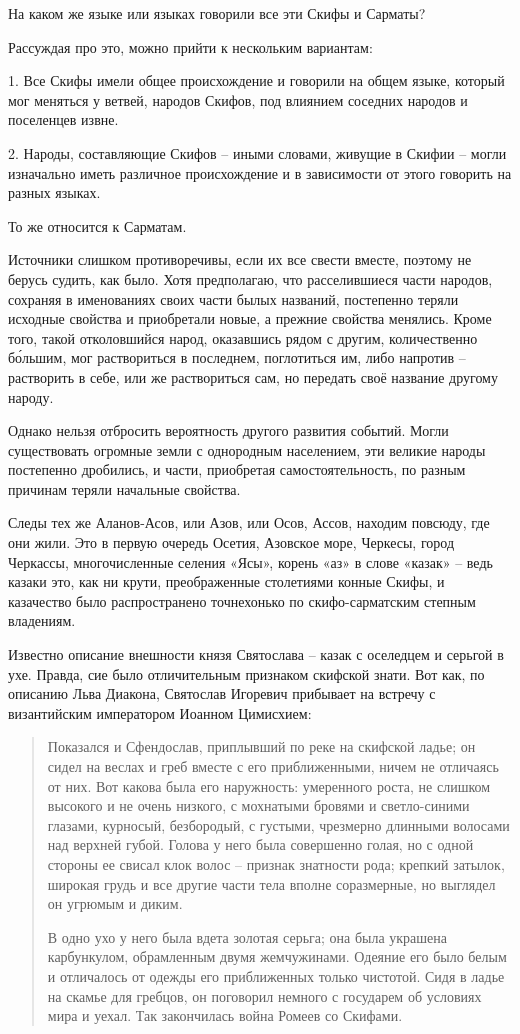 На каком же языке или языках говорили все эти Скифы и Сарматы?

Рассуждая про это, можно прийти к нескольким вариантам:

1. Все Скифы имели общее происхождение и говорили на общем языке, который мог меняться у ветвей, народов Скифов, под влиянием соседних народов и поселенцев извне.

2. Народы, составляющие Скифов – иными словами, живущие в Скифии – могли изначально иметь различное происхождение и в зависимости от этого говорить на разных языках.

То же относится к Сарматам.

Источники слишком противоречивы, если их все свести вместе, поэтому не берусь судить, как было. Хотя предполагаю, что расселившиеся части народов, сохраняя в именованиях своих части былых названий, постепенно теряли исходные свойства и приобретали новые, а прежние свойства менялись. Кроме того, такой отколовшийся народ, оказавшись рядом с другим, количественно б\'ольшим, мог раствориться в последнем, поглотиться им, либо напротив – растворить в себе, или же раствориться сам, но передать своё название другому народу.

Однако нельзя отбросить вероятность другого развития событий. Могли существовать огромные земли с однородным населением, эти великие народы постепенно дробились, и части, приобретая самостоятельность, по разным причинам теряли начальные свойства.

Следы тех же Аланов-Асов, или Азов, или Осов, Ассов, находим повсюду, где они жили. Это в первую очередь Осетия, Азовское море, Черкесы, город Черкассы, многочисленные селения «Ясы», корень «аз» в слове «казак» – ведь казаки это, как ни крути, преображенные столетиями конные Скифы, и казачество было распространено точнехонько по скифо-сарматским степным владениям.

Известно описание внешности князя Святослава – казак с оселедцем и серьгой в ухе. Правда, сие было отличительным признаком скифской знати. Вот как, по описанию Льва Диакона, Святослав Игоревич прибывает на встречу с византийским императором Иоанном Цимисхием\cite{diakon01}:

\begin{quotation}
Показался и Сфендослав, приплывший по реке на скифской ладье; он сидел на веслах и греб вместе с его приближенными, ничем не отличаясь от них. Вот какова была его наружность: умеренного роста, не слишком высокого и не очень низкого, с мохнатыми бровями и светло-синими глазами, курносый, безбородый, с густыми, чрезмерно длинными волосами над верхней губой. Голова у него была совершенно голая, но с одной стороны ее свисал клок волос – признак знатности рода; крепкий затылок, широкая грудь и все другие части тела вполне соразмерные, но выглядел он угрюмым и диким. 

В одно ухо у него была вдета золотая серьга; она была украшена карбункулом, обрамленным двумя жемчужинами. Одеяние его было белым и отличалось от одежды его приближенных только чистотой. Сидя в ладье на скамье для гребцов, он поговорил немного с государем об условиях мира и уехал. Так закончилась война Ромеев со Скифами.
\end{quotation}

